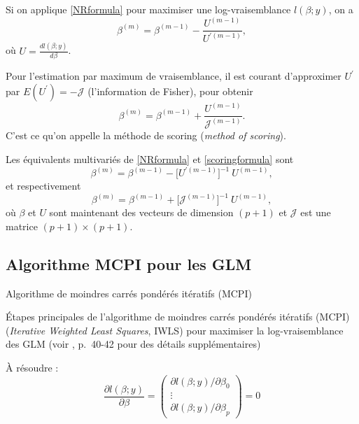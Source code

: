 \documentclass{BeamerTemplate}
\begin{document}
\begin{refsection}
\begin{frame}{}
Si on applique \eqref{NRformula} pour maximiser une log-vraisemblance $l(\beta;y)$, on a
$$\beta^{(m)} = \beta^{(m-1)} - \frac{U^{(m-1)}}{U^{\prime (m-1)}},$$
où $U=  \frac{d l(\beta;y)}{d \beta}$.

\bigskip
Pour l'estimation par maximum de vraisemblance, il est courant d'approximer
$U^{\prime}$ par $E(U^{\prime}) = - {\mathcal J}$ (l'information de Fisher), pour obtenir 
\begin{equation}
  \label{scoringformula}
  \beta^{(m)} = \beta^{(m-1)} + \frac{U^{(m-1)}}{{\mathcal J}^{(m-1)}}.
\end{equation}
C'est ce qu'on appelle la {\color{blue}méthode de scoring} (\textit{method of scoring}).
\end{frame}

\begin{frame}{}
Les équivalents multivariés de  \eqref{NRformula} et
\eqref{scoringformula} sont
$$\beta^{(m)} = \beta^{(m-1)} - \big[U^{\prime (m-1)}\big]^{-1} \ U^{(m-1)},$$
et respectivement
\begin{equation}
  \label{multiscoring}
\beta^{(m)} = \beta^{(m-1)} + \big[{\mathcal J}^{(m-1)}\big]^{-1} \ U^{(m-1)},
\end{equation}
où $\beta$ et $U$ sont maintenant des vecteurs de dimension $(p+1)$ et
${\mathcal J}$ est une matrice $(p+1) \times (p+1)$.
\end{frame}

\subsection{Algorithme MCPI pour les GLM}

\begin{frame}{Algorithme de moindres carrés pondérés itératifs (MCPI)}

Étapes principales de l'algorithme de {\color{blue} moindres carrés pondérés itératifs (MCPI)}
(\textit{Iterative Weighted Least Squares}, IWLS) pour maximiser la log-vraisemblance des GLM (voir ,
p.\ 40-42 pour des détails supplémentaires) 

\bigskip
À résoudre :
$$\frac{\partial l(\beta;y)}{\partial \beta} =  \left(
\begin{array}{c}
\partial l(\beta;y)/\partial \beta_0\\
\vdots\\
\partial l(\beta;y)/\partial \beta_p
\end{array} \right) = 0$$


\end{frame}
\end{refsection}
\end{document}
